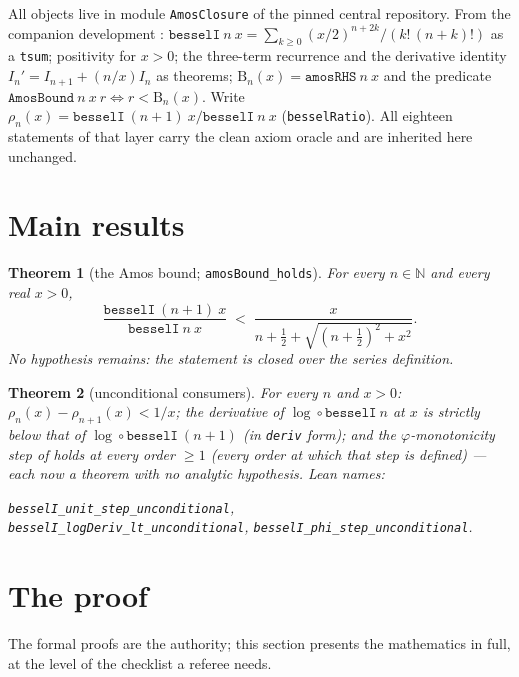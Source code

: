 \documentclass[11pt]{article}
\newtheorem{theorem}{Theorem}[section]
\newcommand{\lean}[1]{\texttt{#1}}
\newcommand{\RHS}{\mathrm{B}}
\begin{document}
All objects live in module \lean{AmosClosure} of the pinned central
repository.  From the companion development \cite{ErikssonC2}:
$\lean{besselI}\ n\ x = \sum_{k\ge0} (x/2)^{n+2k}/(k!\,(n+k)!)$ as a
\lean{tsum}; positivity for $x > 0$; the three-term recurrence and
the derivative identity $I_n' = I_{n+1} + (n/x)I_n$ as theorems;
$\RHS_n(x) = \lean{amosRHS}\ n\ x$ and the predicate
$\lean{AmosBound}\ n\ x\ r \iff r < \RHS_n(x)$.  Write $\rho_n(x) =
\lean{besselI}\ (n{+}1)\ x / \lean{besselI}\ n\ x$
(\lean{besselRatio}).  All eighteen statements of that layer carry
the clean axiom oracle and are inherited here unchanged.

\section{Main results}\label{sec:results}

\begin{theorem}[the Amos bound; \lean{amosBound\_holds}]
\label{thm:main}
For every $n \in \mathbb{N}$ and every real $x > 0$,
\[
\frac{\lean{besselI}\ (n{+}1)\ x}{\lean{besselI}\ n\ x}
\;<\; \frac{x}{n+\tfrac12+\sqrt{(n+\tfrac12)^2+x^2}} .
\]
No hypothesis remains: the statement is closed over the series
definition.
\end{theorem}

\begin{theorem}[unconditional consumers]\label{thm:consumers}
For every $n$ and $x > 0$: $\rho_n(x) - \rho_{n+1}(x) < 1/x$; the
derivative of $\log \circ \lean{besselI}\ n$ at $x$ is strictly
below that of $\log \circ \lean{besselI}\ (n{+}1)$ (in \lean{deriv}
form); and the $\varphi$-monotonicity step of \cite{ErikssonC2}
holds at every order $\ge 1$ (every order at which that step is
defined) --- each now a theorem with no analytic hypothesis.  Lean names:
\begin{center}\small
\lean{besselI\_unit\_step\_unconditional},\\
\lean{besselI\_logDeriv\_lt\_unconditional},
\lean{besselI\_phi\_step\_unconditional}.
\end{center}
\end{theorem}

\section{The proof}\label{sec:proof}

The formal proofs are the authority; this section presents the
mathematics in full, at the level of the checklist a referee needs.
\end{document}
